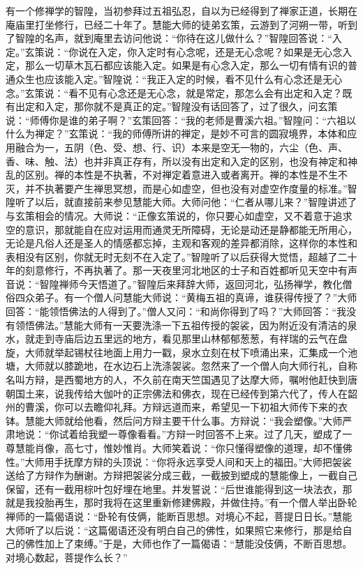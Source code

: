 \documentclass[12pt,twoside,openany]{book}
\newcommand{\kai}[1]{{\CJKfamily{kai}#1}}
\begin{document}
\kai{有一个修禅学的智隍，当初参拜过五祖弘忍，自以为已经得到了禅家正道，长期在庵庙里打坐修行，已经二十年了。慧能大师的徒弟玄策，云游到了河朔一带，听到了智隍的名声，就到庵里去访问他说：“你待在这儿做什么？”智隍回答说：“入定。”玄策说：“你说在入定，你入定时有心念呢，还是无心念呢？如果是无心念入定，那么一切草木瓦石都应该能入定。如果是有心念入定，那么一切有情有识的普通众生也应该能入定。”智隍说：“我正入定的时候，看不见什么有心念还是无心念。”玄策说：“看不见有心念还是无心念，就是常定，那怎么会有出定和入定？既有出定和入定，那你就不是真正的定。”智隍没有话回答了，过了很久，问玄策说：“师傅你是谁的弟子啊？”玄策回答：“我的老师是曹溪六祖。”智隍问：“六祖以什么为禅定？”玄策说：“我的师傅所讲的禅定，是妙不可言的圆寂境界，本体和应用融合为一，五阴（色、受、想、行、识）本来是空无一物的，六尘（色、声、香、味、触、法）也并非真正存有，所以没有出定和入定的区别，也没有神定和神乱的区别。禅的本性是不执著，不对禅定着意进入或者离开。禅的本性是不生不灭，并不执著要产生禅思冥想，而是心如虚空，但也没有对虚空作度量的标准。”智隍听了以后，就直接前来参见慧能大师。大师问他：“仁者从哪儿来？”智隍讲述了与玄策相会的情况。大师说：“正像玄策说的，你只要心如虚空，又不着意于追求空的意识，那就能自在应对运用而通灵无所障碍，无论是动还是静都能无所用心，无论是凡俗人还是圣人的情感都忘掉，主观和客观的差异都消除，这样你的本性和表相没有区别，你就无时无刻不在入定了。”智隍听了以后获得大觉悟，超越了二十年的刻意修行，不再执著了。那一天夜里河北地区的士子和百姓都听见天空中有声音说：“智隍禅师今天悟道了。”智隍后来拜辞大师，返回河北，弘扬禅学，教化僧俗四众弟子。有一个僧人问慧能大师说：“黄梅五祖的真谛，谁获得传授了？”大师回答：“能领悟佛法的人得到了。”僧人又问：“和尚你得到了吗？”大师回答：“我没有领悟佛法。”慧能大师有一天要洗涤一下五祖传授的袈裟，因为附近没有清洁的泉水，就走到寺庙后边五里远的地方，看见那里山林郁郁葱葱，有祥瑞的云气在盘旋，大师就举起锡杖往地面上用力一戳，泉水立刻在杖下喷涌出来，汇集成一个池塘，大师就以膝跪地，在水边石上洗涤袈裟。忽然来了一个僧人向大师行礼，自称名叫方辩，是西蜀地方的人，不久前在南天竺国遇见了达摩大师，嘱咐他赶快到唐朝国土来，说我传给大伽叶的正宗佛法和佛衣，现在已经传到第六代了，传人在韶州的曹溪，你可以去瞻仰礼拜。方辩远道而来，希望见一下初祖大师传下来的衣钵。慧能大师就给他看，然后问方辩主要干什么事。方辩说：“我会塑像。”大师严肃地说：“你试着给我塑一尊像看看。”方辩一时回答不上来。过了几天，塑成了一尊慧能肖像，高七寸，惟妙惟肖。大师笑着说：“你只懂得塑像的道理，却不懂佛性。”大师用手抚摩方辩的头顶说：“你将永远享受人间和天上的福田。”大师把袈裟送给了方辩作为酬谢。方辩把袈裟分成三截，一截披到塑成的慧能像上，一截自己保留，还有一截用棕叶包好埋在地里。并发誓说：“后世谁能得到这一块法衣，那就是我投胎再生，那时我将在这里重新修建佛殿，并做住持。”有一个僧人举出卧轮禅师的一篇偈语说：“卧轮有伎俩，能断百思想。对境心不起，菩提日日长。”慧能大师听了以后说：“这篇偈语还没有明白自己的佛性，如果照它来修行，那是给自己的佛性加上了束缚。”于是，大师也作了一篇偈语：“慧能没伎俩，不断百思想。对境心数起，菩提作么长？”}
\end{document}
